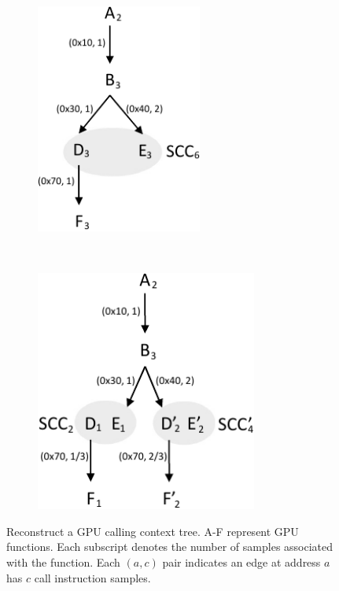 \begin{figure}[t]
~
\begin{subfigure}{0.22\textwidth}
\centering
\includegraphics[width=0.6\textwidth]{fig/cct-3.pdf}
\caption{}
\end{subfigure}
~
\begin{subfigure}{0.22\textwidth}
\centering
\includegraphics[width=0.8\textwidth]{fig/cct-4.pdf}
\caption{}
\end{subfigure}
\caption{Reconstruct a GPU calling context tree. A-F represent GPU functions. Each subscript denotes the number of samples associated with the function. Each $(a, c)$ pair indicates an edge at address $a$ has $c$ call instruction samples.}
\label{fig:gpu calling context tree}
\end{figure}

